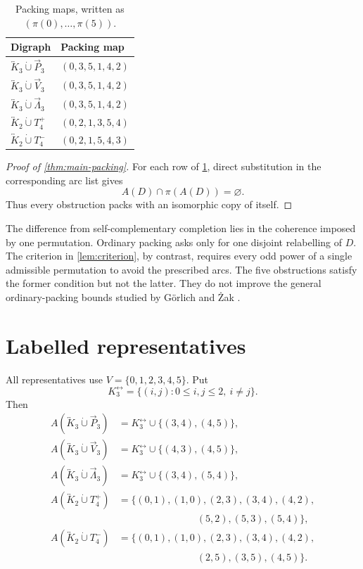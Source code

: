 \documentclass[11pt,reqno]{amsart}
\theoremstyle{definition}
\newcommand{\bK}[1]{\overleftrightarrow{K}_{#1}}
\newcommand{\dP}{\overrightarrow{P}_{3}}
\newcommand{\dV}{\overrightarrow{V}_{3}}
\newcommand{\dL}{\overrightarrow{\Lambda}_{3}}
\newcommand{\dunion}{\mathbin{\dot\cup}}
\begin{document}
\begin{table}[ht]
\caption{Packing maps, written as \((\pi(0),\ldots,\pi(5))\).}
\label{tab:packing-certificates}
\centering
\small
\begin{tabular}{@{}ll@{}}
\toprule
Digraph & Packing map \\
\midrule
\(\bK{3}\dunion\dP\) & \((0,3,5,1,4,2)\) \\
\(\bK{3}\dunion\dV\) & \((0,3,5,1,4,2)\) \\
\(\bK{3}\dunion\dL\) & \((0,3,5,1,4,2)\) \\
\(\bK{2}\dunion T_4^+\) & \((0,2,1,3,5,4)\) \\
\(\bK{2}\dunion T_4^-\) & \((0,2,1,5,4,3)\) \\
\bottomrule
\end{tabular}
\end{table}

\begin{proof}[Proof of \cref{thm:main-packing}]
For each row of \cref{tab:packing-certificates}, direct substitution in the corresponding arc list gives
\[
A(D)\cap\pi(A(D))=\varnothing.
\]
Thus every obstruction packs with an isomorphic copy of itself.
\end{proof}

The difference from self-complementary completion lies in the coherence imposed by one permutation. Ordinary packing asks only for one disjoint relabelling of \(D\). The criterion in \cref{lem:criterion}, by contrast, requires every odd power of a single admissible permutation to avoid the prescribed arcs. The five obstructions satisfy the former condition but not the latter. They do not improve the general ordinary-packing bounds studied by Görlich and Żak \cite{GZ10}.

\appendix

\section{Labelled representatives}\label{app:representatives}

All representatives use \(V=\{0,1,2,3,4,5\}\). Put
\[
K_3^{\leftrightarrow}=\{(i,j):0\le i,j\le2,\ i\ne j\}.
\]
Then
\begin{align*}
A(\bK{3}\dunion\dP)
  &=K_3^{\leftrightarrow}\cup\{(3,4),(4,5)\},\\
A(\bK{3}\dunion\dV)
  &=K_3^{\leftrightarrow}\cup\{(4,3),(4,5)\},\\
A(\bK{3}\dunion\dL)
  &=K_3^{\leftrightarrow}\cup\{(3,4),(5,4)\},\\
A(\bK{2}\dunion T_4^+)
  &=\{(0,1),(1,0),(2,3),(3,4),(4,2),\\[-2pt]
  &\hspace{8em}(5,2),(5,3),(5,4)\},\\
A(\bK{2}\dunion T_4^-)
  &=\{(0,1),(1,0),(2,3),(3,4),(4,2),\\[-2pt]
  &\hspace{8em}(2,5),(3,5),(4,5)\}.
\end{align*}
\end{document}
